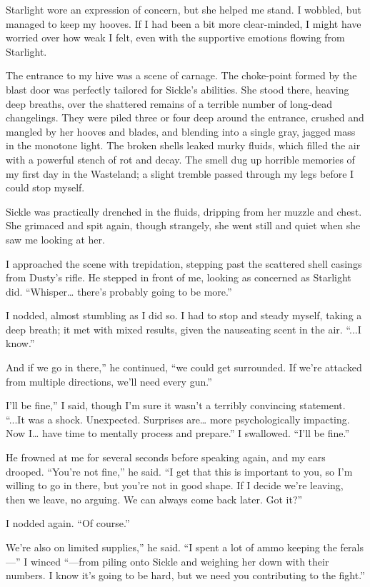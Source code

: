Starlight wore an expression of concern, but she helped me stand. I wobbled, but managed to keep my hooves. If I had been a bit more clear-minded, I might have worried over how weak I felt, even with the supportive emotions flowing from Starlight.

The entrance to my hive was a scene of carnage. The choke-point formed by the blast door was perfectly tailored for Sickle’s abilities. She stood there, heaving deep breaths, over the shattered remains of a terrible number of long-dead changelings. They were piled three or four deep around the entrance, crushed and mangled by her hooves and blades, and blending into a single gray, jagged mass in the monotone light. The broken shells leaked murky fluids, which filled the air with a powerful stench of rot and decay. The smell dug up horrible memories of my first day in the Wasteland; a slight tremble passed through my legs before I could stop myself.

Sickle was practically drenched in the fluids, dripping from her muzzle and chest. She grimaced and spit again, though strangely, she went still and quiet when she saw me looking at her.

I approached the scene with trepidation, stepping past the scattered shell casings from Dusty’s rifle. He stepped in front of me, looking as concerned as Starlight did. “Whisper… there’s probably going to be more.”

I nodded, almost stumbling as I did so. I had to stop and steady myself, taking a deep breath; it met with mixed results, given the nauseating scent in the air. “...I know.”

\leavevmode{}And if we go in there,” he continued, “we could get surrounded. If we’re attacked from multiple directions, we’ll need every gun.”

\leavevmode{}I’ll be fine,” I said, though I’m sure it wasn’t a terribly convincing statement. “...It was a shock. Unexpected. Surprises are… more psychologically impacting. Now I… have time to mentally process and prepare.” I swallowed. “I’ll be fine.”

He frowned at me for several seconds before speaking again, and my ears drooped. “You’re not fine,” he said. “I get that this is important to you, so I’m willing to go in there, but you’re not in good shape. If I decide we’re leaving, then we leave, no arguing. We can always come back later. Got it?”

I nodded again. “Of course.”

\leavevmode{}We’re also on limited supplies,” he said. “I spent a lot of ammo keeping the ferals—” I winced “—from piling onto Sickle and weighing her down with their numbers. I know it’s going to be hard, but we need you contributing to the fight.”

